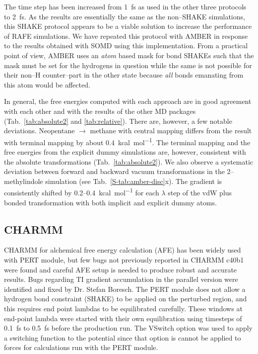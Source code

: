 \documentclass[journal=jctcce,manuscript=article]{achemso}
\begin{document}
The time step has been increased from \SI{1}{fs} as used in the other
three protocols to \SI{2}{fs}.  As the results are essentially the same as the
non--SHAKE simulations, this SHAKE protocol appears to be a viable solution to
increase the performance of RAFE simulations.  We have repeated this protocol
with AMBER in response to the results obtained with SOMD using this
implementation.  From a practical point of view, AMBER uses an \emph{atom}
based mask for bond SHAKEs such that the mask must be set for the hydrogens in
question while the same is not possible for their non--H counter--part in the
other state because \emph{all} bonds emanating from this atom would be affected.

In general, the free energies computed with each approach are in good agreement
with each other and with the results of the other MD packages
(Tab.~\ref{tab:absolute2} and \ref{tab:relative}).  There are, however, a few
notable deviations.  Neopentane $\rightarrow$ methane with central mapping
differs from the result with terminal mapping by about
\SI{0.4}{kcal.mol^{-1}}.  The terminal mapping and the free energies from the
explicit dummy simulations are, however, consistent with the absolute
transformations (Tab.~\ref{tab:absolute2}).  We also observe a systematic
deviation between forward and backward vacuum transformations in the
2--methylindole simulation (see Tab.~\ref{S-tab:amber-disc}x).  The gradient
is consistently shifted by 0.2--\SI{0.4}{kcal.mol^{-1}} for each $\lambda$ step
of the vdW plus bonded transformation with both implicit and explicit dummy
atoms.


\subsection{CHARMM}
\label{sec:charmm-results}

CHARMM for alchemical free energy calculation (AFE) has been widely used with PERT module, but few bugs not previously reported in CHARMM c40b1 were found and careful AFE setup is needed to produce robust and accurate results. Bugs regarding TI gradient accumulation in the parallel version were identified and fixed by Dr. Stefan Boresch.
The PERT module does not allow a hydrogen bond constraint (SHAKE) to be applied on the perturbed region, and this requires end point lambdas to be equilibrated carefully. These windows at end-point lambda were started with their own equilibration using timesteps of \SI{0.1}{fs} to \SI{0.5}{fs} before the production run. The VSwitch option was used to apply a switching function to the potential since that option is cannot be applied to forces for calculations run with the PERT module.
\end{document}
